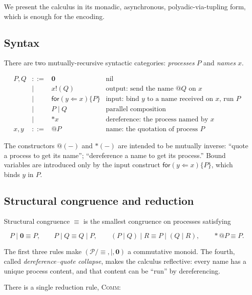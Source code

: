 \documentclass[11pt]{article}
\makeatletter
\theoremstyle{plain}
\theoremstyle{definition}
\theoremstyle{remark}
\newcommand{\nil}{\mathbf{0}}
\newcommand{\quo}[1]{@#1}
\newcommand{\drp}[1]{{\ast}#1}
\newcommand{\snd}[2]{#1!(#2)}
\newcommand{\rcv}[3]{\mathsf{for}(#1 \Leftarrow #2)\{#3\}}
\newcommand{\sequiv}{\equiv}
\newcommand{\sn}{\mathbin{\mid}}    %
\newcommand{\Procs}{\mathcal{P}}
\makeatother
\begin{document}
We present the calculus in its monadic, asynchronous, polyadic-via-tupling
form, which is enough for the encoding.

\subsection{Syntax}

There are two mutually-recursive syntactic categories: \emph{processes} $P$
and \emph{names} $x$.

$$
\begin{array}{rcll}
P, Q & ::= & \nil                         & \text{nil}\\
     &  |  & \snd{x}{Q}                   & \text{output: send the name $\quo{Q}$ on $x$}\\
     &  |  & \rcv{y}{x}{P}                & \text{input: bind $y$ to a name received on $x$, run $P$}\\
     &  |  & P \sn Q                      & \text{parallel composition}\\
     &  |  & \drp{x}                      & \text{dereference: the process named by $x$}\\[6pt]
x, y & ::= & \quo{P}                      & \text{name: the quotation of process $P$}
\end{array}
$$

The constructors $\quo{(-)}$ and $\drp{(-)}$ are intended to be mutually
inverse: ``quote a process to get its name''; ``dereference a name to get
its process.'' Bound variables are introduced only by the input
construct $\rcv{y}{x}{P}$, which binds $y$ in $P$.

\subsection{Structural congruence and reduction}

Structural congruence $\sequiv$ is the smallest congruence on processes
satisfying

$$
P \sn \nil \sequiv P,
\qquad
P \sn Q \sequiv Q \sn P,
\qquad
(P \sn Q) \sn R \sequiv P \sn (Q \sn R),
\qquad
\drp{\quo{P}} \sequiv P.
$$

\noindent The first three rules make $(\Procs/\sequiv, \sn, \nil)$ a
commutative monoid. The fourth, called \emph{dereference--quote
collapse}, makes the calculus reflective: every name has a unique process
content, and that content can be ``run'' by dereferencing.

There is a single reduction rule, \textsc{Comm}:
\end{document}
